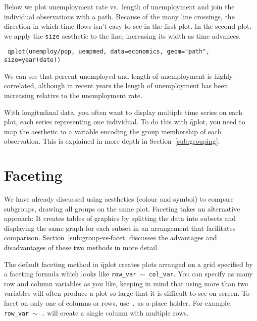 Below we plot unemployment rate vs.\ length of unemployment and join the individual observations with a path.  Because of the many line crossings, the direction in which time flows isn't easy to see in the first plot.  In the second plot, we apply the {\tt size} aesthetic to the line, increasing its width as time advances.

{\tt
qplot(unemploy/pop, uempmed, data=economics, geom="path", size=year(date))
}

We can see that percent unemployed and length of unemployment is highly correlated, although in recent years the length of unemployment has been increasing relative to the unemployment rate.

% 


With longitudinal data, you often want to display multiple time series on each plot, each series representing one individual.  To do this with \f{qplot}, you need to map the  aesthetic to a variable encoding the group membership of each observation. This is explained in more depth in Section~\ref{sub:grouping}.

\section{Faceting}\label{sec:faceting}

We have already discussed using aesthetics (colour and symbol) to compare subgroups, drawing all groups on the same plot. Faceting takes an alternative approach: It creates tables of graphics by splitting the data into subsets and displaying the same graph for each subset in an arrangement that facilitates comparison. Section~\ref{sub:group-vs-facet} discusses the advantages and disadvantages of these two methods in more detail.

The default faceting method in \f{qplot} creates plots arranged on a grid specified by a faceting formula which looks like {\tt row\_var $\sim$ col\_var}.  You can specify as many row and column variables as you like, keeping in mind that using more than two variables will often produce a plot so large that it is difficult to see on screen.  To facet on only one of columns or rows, use {\tt .} as a place holder.  For example, {\tt row\_var $\sim$ .} will create a single column with multiple rows.

